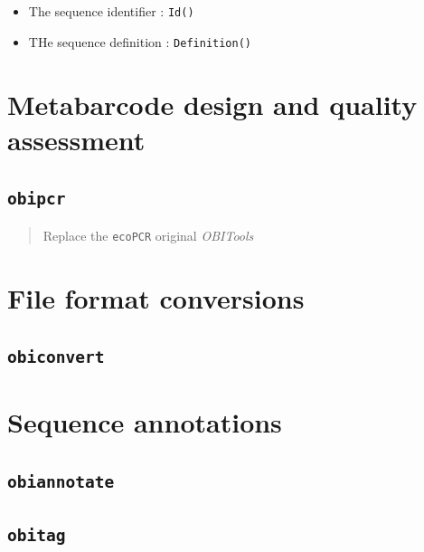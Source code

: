\documentclass[
  letterpaper,
  DIV=11,
  numbers=noendperiod]{scrreprt}
\providecommand{\tightlist}{%
  \setlength{\itemsep}{0pt}\setlength{\parskip}{0pt}}\usepackage{longtable,booktabs,array}
\begin{document}
\begin{itemize}
\tightlist
\item
  The sequence identifier : \texttt{Id()}
\item
  THe sequence definition : \texttt{Definition()}
\end{itemize}

\hypertarget{metabarcode-design-and-quality-assessment}{%
\chapter{Metabarcode design and quality
assessment}\label{metabarcode-design-and-quality-assessment}}

\hypertarget{obipcr}{%
\section{\texorpdfstring{\texttt{obipcr}}{obipcr}}\label{obipcr}}

\begin{quote}
Replace the \texttt{ecoPCR} original \emph{OBITools}
\end{quote}

\hypertarget{file-format-conversions}{%
\chapter{File format conversions}\label{file-format-conversions}}

\hypertarget{obiconvert}{%
\section{\texorpdfstring{\texttt{obiconvert}}{obiconvert}}\label{obiconvert}}

\hypertarget{sequence-annotations}{%
\chapter{Sequence annotations}\label{sequence-annotations}}

\hypertarget{obiannotate}{%
\section{\texorpdfstring{\texttt{obiannotate}}{obiannotate}}\label{obiannotate}}

\hypertarget{obitag}{%
\section{\texorpdfstring{\texttt{obitag}}{obitag}}\label{obitag}}
\end{document}
